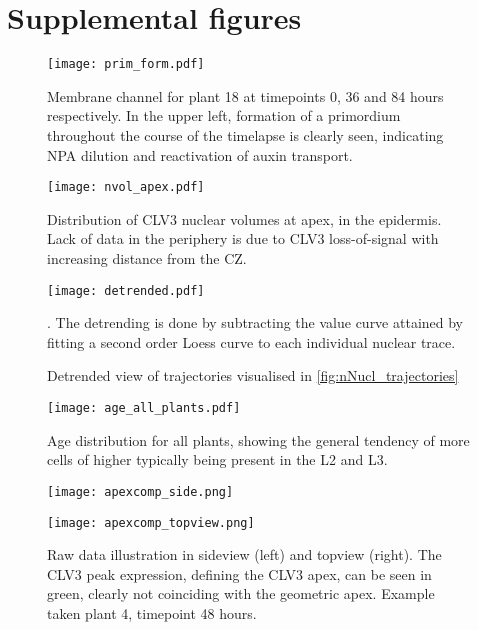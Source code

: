 
\ifpdf
\graphicspath{{Appendix2/Figs/Raster/}{Appendix2/Figs/PDF/}{Appendix2/Figs/}}
\else
\graphicspath{{Appendix2/Figs/Vector/}{Appendix2/Figs/}}
\fi

\chapter{Supplemental figures}

\begin{figure}[H]
  \centering
  \texttt{[image: prim\_form.pdf]}
  \caption[NPA dilution causes primordia formation]{Membrane channel for plant
    18 at timepoints 0, 36 and 84 hours respectively. In the upper left,
    formation of a primordium throughout the course of the timelapse is clearly
    seen, indicating NPA dilution and reactivation of auxin transport.}
  \label{fig:NPA_primordia}
\end{figure}

\begin{figure}[H]
  \centering
  \texttt{[image: nvol\_apex.pdf]}
  \caption[Nuclear volumes at apex]{Distribution of CLV3 nuclear volumes at
    apex, in the epidermis. Lack of data in the periphery is due to CLV3
    loss-of-signal with increasing distance from the CZ. }
  \label{fig:nvol_apex}
\end{figure}

\begin{figure}[H]
  \centering
  \texttt{[image: detrended.pdf]}
  \caption[Detrended nuclear trajectories]{Detrended view of trajectories
    visualised in \cref{fig:nNucl_trajectories}}. The detrending is done by
  subtracting the value curve attained by fitting a second order Loess curve to
  each individual nuclear trace.
  \label{fig:detrended}
\end{figure}

\begin{figure}[H]
  \centering
  \texttt{[image: age\_all\_plants.pdf]}
  \caption[Age distribution, all plants]{Age distribution for all plants,
    showing the general tendency of more cells of higher typically being present
    in the L2 and L3.}
  \label{fig:age_all}
\end{figure}

\begin{figure}[H]
  \centering
  \begin{minipage}[t]{.49\textwidth}
    \centering
    \texttt{[image: apexcomp\_side.png]}
  \end{minipage}
  \begin{minipage}[t]{.49\textwidth}
    \centering
    \texttt{[image: apexcomp\_topview.png]}
  \end{minipage}
  \caption[Non-overlapping apices]{Raw data illustration in sideview (left) and
    topview (right). The CLV3 peak expression, defining the CLV3 apex, can be
    seen in green, clearly not coinciding with the geometric apex. Example taken
    plant 4, timepoint 48 hours.}
  \label{fig:apex_center}
\end{figure}

